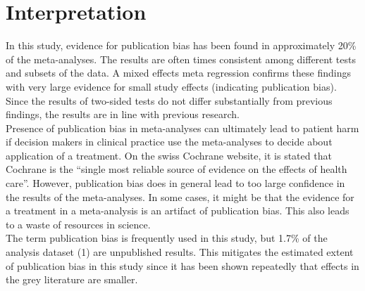 \documentclass[11pt,a4paper,twoside]{book}\usepackage[]{graphicx}\usepackage[]{color}
\begin{document}
\section{Interpretation}
In this study, evidence for publication bias has been found in approximately 20\% of the meta-analyses. The results are often times consistent among different tests and subsets of the data. A mixed effects meta regression confirms these findings with very large evidence for small study effects (indicating publication bias). Since the results of two-sided tests do not differ substantially from previous findings, the results are in line with previous research.\\
Presence of publication bias in meta-analyses can ultimately lead to patient harm if decision makers in clinical practice use the meta-analyses to decide about application of a treatment. On the swiss Cochrane website, it is stated that Cochrane is the ``single most reliable source of evidence on the effects of health care''. However, publication bias does in general lead to too large confidence in the results of the meta-analyses. In some cases, it might be that the  evidence for a treatment in a meta-analysis is an artifact of publication bias. This also leads to a waste of resources in science. \\
The term publication bias is frequently used in this study, but 1.7\% of the analysis dataset (1) are unpublished results. This mitigates the estimated extent of publication bias in this study since it has been shown repeatedly that effects in the grey literature are smaller.
\end{document}
